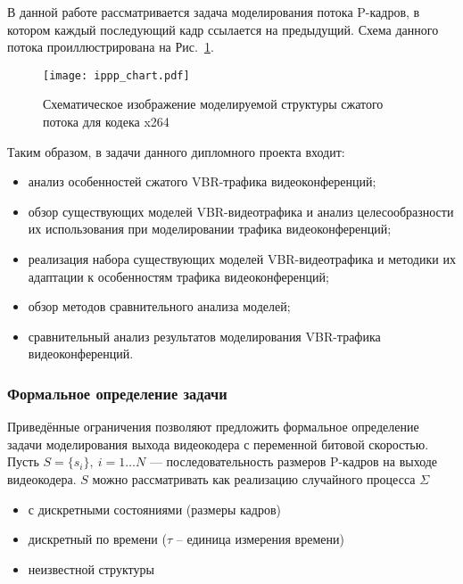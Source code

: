 В данной работе рассматривается задача моделирования потока
P-кадров, в котором каждый последующий кадр ссылается на
предыдущий. Схема данного потока проиллюстрирована на Рис.~\ref{fig:ippp_frames}.

\begin{figure}[h]
    \begin{center}
        \texttt{[image: ippp\_chart.pdf]}
    \end{center}
    \caption{Схематическое изображение моделируемой структуры сжатого потока
    для кодека x264}
    \label{fig:ippp_frames}
\end{figure}

Таким образом, в задачи данного дипломного проекта входит:

\begin{itemize}
    \item анализ особенностей сжатого VBR-трафика видеоконференций;
    \item обзор существующих моделей VBR-видеотрафика и анализ
        целесообразности их использования при моделировании
        трафика видеоконференций;
    \item реализация набора существующих моделей VBR-видеотрафика
        и методики их адаптации к особенностям трафика видеоконференций;
    \item обзор методов сравнительного анализа моделей;
    \item сравнительный анализ результатов моделирования VBR-трафика
        видеоконференций.
\end{itemize}

\subsubsection{Формальное определение задачи}
\label{sse:task}
\hspace{3pt}

Приведённые ограничения позволяют предложить формальное определение задачи
моделирования выхода видеокодера с переменной битовой скоростью.
Пусть $S = \{s_i\},~i=1\dots N$ --- последовательность размеров P-кадров на выходе видеокодера.
$S$ можно рассматривать как реализацию случайного процесса $\Sigma$~\cite{randomprocesses}
\begin{itemize}
    \item с дискретными состояниями (размеры кадров)
    \item дискретный по времени ($\tau$ -- единица измерения времени)
    \item неизвестной структуры
\end{itemize}

